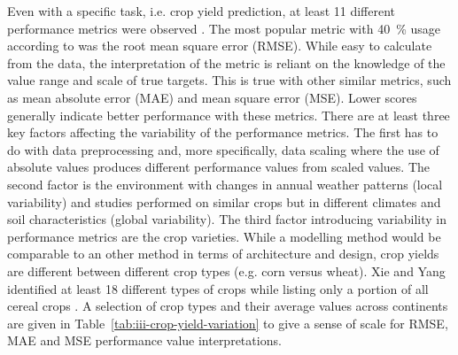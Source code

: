 Even with a specific task, i.e. crop yield prediction, at least 11 different performance metrics were observed \cite{VanKlompenburg2020}. The most popular metric with 40~\% usage according to \cite{VanKlompenburg2020} was the root mean square error (RMSE). While easy to calculate from the data, the interpretation of the metric is reliant on the knowledge of the value range and scale of true targets. This is true with other similar metrics, such as mean absolute error (MAE) and mean square error (MSE). Lower scores generally indicate better performance with these metrics. There are at least three key factors affecting the variability of the performance metrics. The first has to do with data preprocessing and, more specifically, data scaling where the use of absolute values produces different performance values from scaled values. The second factor is the environment with changes in annual weather patterns (local variability) and studies performed on similar crops but in different climates and soil characteristics (global variability). The third factor introducing variability in performance metrics are the crop varieties. While a modelling method would be comparable to an other method in terms of architecture and design, crop yields are different between different crop types (e.g. corn versus wheat). Xie and Yang identified at least 18 different types of crops while listing only a portion of all cereal crops \cite{Xie2020}. A selection of crop types and their average values across continents are given in Table~\ref{tab:iii-crop-yield-variation} to give a sense of scale for RMSE, MAE and MSE performance value interpretations.  

